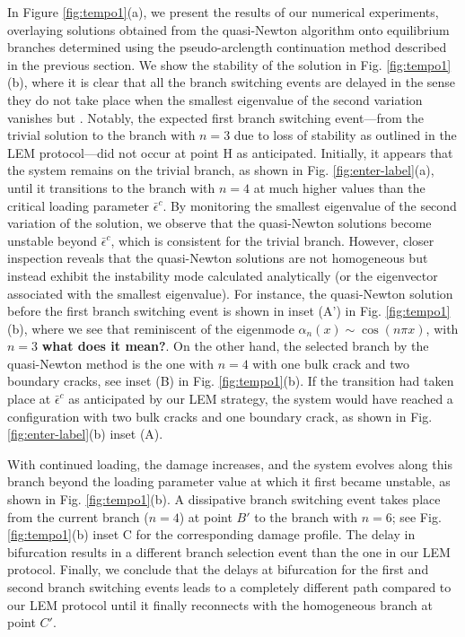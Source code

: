 In Figure \ref{fig:tempo1}(a), we present the results of our numerical experiments, overlaying solutions obtained from the quasi-Newton algorithm onto equilibrium branches determined using the pseudo-arclength continuation method described in the previous section. We show the stability of the solution in  Fig. \ref{fig:tempo1}(b), where it is clear that all the branch switching events are delayed in the sense they do not  take place when the smallest eigenvalue of the second variation vanishes but . Notably, the expected first branch switching event—from the trivial solution to the branch with \(n=3\) due to loss of stability as outlined in the LEM protocol—did not occur at point H as anticipated. Initially, it appears that the system remains on the trivial branch, as shown in Fig. \ref{fig:enter-label}(a), until it transitions to the branch with \(n=4\) at much higher values than the critical loading parameter \(\bar{\epsilon}^c\). By monitoring the smallest eigenvalue of the second variation of the solution, we observe that the quasi-Newton solutions become unstable beyond \(\bar{\epsilon}^c\), which is consistent for the trivial branch. However, closer inspection reveals that the quasi-Newton solutions are not homogeneous but instead exhibit the instability mode calculated analytically (or  the eigenvector associated with the smallest eigenvalue). For instance, the  quasi-Newton solution before the first branch switching event is shown in inset (A') in Fig. \ref{fig:tempo1}(b), where we see that  reminiscent of the eigenmode \(\alpha_n(x) \sim \cos(n\pi x)\),  with \(n=3\) \textbf{what does it mean?}. On the other hand, the selected branch  by the quasi-Newton method is the one with \(n=4\) with one bulk crack and two boundary cracks, see inset (B) in Fig. \ref{fig:tempo1}(b). If the transition had taken place at \(\bar{\epsilon}^c\) as anticipated by our LEM strategy, the system would have reached a configuration with two bulk cracks and one boundary crack, as shown in Fig. \ref{fig:enter-label}(b) inset (A).

With continued loading, the damage increases, and the system evolves along this branch beyond the loading parameter value at which it first became unstable, as shown in Fig. \ref{fig:tempo1}(b). A dissipative branch switching event takes place from the current branch (\(n=4\)) at point \(B'\) to the branch with \(n=6\); see Fig. \ref{fig:tempo1}(b) inset C for the corresponding damage profile. The delay in bifurcation results in a different branch selection event than the one in our LEM protocol. Finally, we conclude that the delays at bifurcation for the first and second branch switching events leads to a completely different path compared to our LEM protocol until it finally reconnects with the homogeneous branch at point \(C'\).

